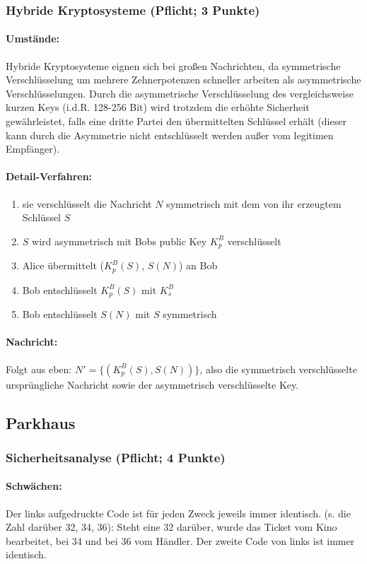 \documentclass{article}
\begin{document}
\subsubsection{Hybride Kryptosysteme (Pflicht; 3 Punkte)}
\paragraph{Umstände:}
Hybride Kryptosysteme eignen sich bei großen Nachrichten, da symmetrische Verschlüsselung um mehrere Zehnerpotenzen schneller arbeiten als asymmetrische Verschlüsselungen.
Durch die asymmetrische Verschlüsselung des vergleichsweise kurzen Keys (i.d.R. 128-256 Bit) wird trotzdem die erhöhte Sicherheit gewährleistet, falls eine dritte Partei den übermittelten Schlüssel erhält (dieser kann durch die Asymmetrie nicht entschlüsselt werden außer vom legitimen Empfänger).
\paragraph{Detail-Verfahren:}
\begin{enumerate}
	\item sie verschlüsselt die Nachricht $N$ symmetrisch mit dem von ihr erzeugtem Schlüssel $S$
	\item $S$ wird asymmetrisch mit Bobs public Key $K_p^B$ verschlüsselt
	\item Alice übermittelt ($K_p^B(S)$, $S(N)$) an Bob
	\item Bob entschlüsselt $K_p^B(S)$ mit $K_s^B$
	\item Bob entschlüsselt $S(N)$ mit $S$ symmetrisch
\end{enumerate}
\paragraph{Nachricht:}
Folgt aus eben: $N' = \{(K_p^B(S),S(N))\}$, also die symmetrisch verschlüsselte ursprüngliche Nachricht sowie der asymmetrisch verschlüsselte Key.
\subsection{Parkhaus}
\subsubsection{Sicherheitsanalyse (Pflicht; 4 Punkte)}
\paragraph{Schwächen:}
Der links aufgedruckte Code ist für jeden Zweck jeweils immer identisch. (s. die Zahl darüber 32, 34, 36): Steht eine 32 darüber, wurde das Ticket vom Kino bearbeitet, bei 34 und bei 36 vom Händler.
Der zweite Code von links ist immer identisch.
\end{document}

